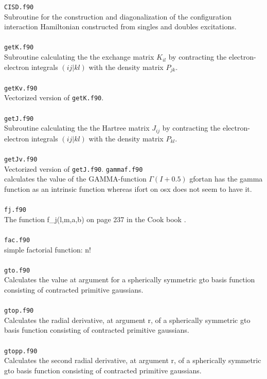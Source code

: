 \documentclass[a4paper,twoside,openany]{book}
\begin{document}
{{\texttt{CISD.f90}\\
Subroutine for the construction and diagonalization of the configuration interaction Hamiltonian constructed from  singles and doubles excitations. \\ \\
\texttt{getK.f90}\\
Subroutine calculating the the exchange matrix $K_{il}$ by contracting  the electron-electron integrals $(ij|kl)$ with the density matrix $P_{jk}$. \\ \\
\texttt{getKv.f90}\\
Vectorized version of \texttt{getK.f90}. \\ \\
\texttt{getJ.f90}\\
Subroutine calculating the the Hartree matrix $J_{ij}$ by contracting  the electron-electron integrals $(ij|kl)$ with the density matrix $P_{kl}$. \\ \\
\texttt{getJv.f90}\\
Vectorized version of \texttt{getJ.f90}. 
\newpage
\noindent
\texttt{gammaf.f90}\\
calculates the value of the GAMMA-function $\Gamma(I+0.5)$
gfortan has the gamma function as an intrinsic function 
whereas ifort on osx does not seem to have it.\\ \\
\texttt{fj.f90} \\
The function f\_j(l,m,a,b) on page 237 in the Cook book \cite{Cook}. \\ \\
\texttt{fac.f90}\\
simple factorial function: n! \\ \\
\texttt{gto.f90}\\
Calculates the value at argument for a spherically symmetric gto
basis function consisting of contracted primitive gaussians. \\ \\
\texttt{gtop.f90}\\
Calculates the radial derivative, at argument r, of a spherically symmetric
gto  basis function consisting of contracted primitive gaussians. \\ \\
\texttt{gtopp.f90}\\
Calculates the second radial derivative, at argument r, of a spherically
symmetric gto basis function consisting of contracted primitive gaussians. \\ \\
}}
\end{document}
